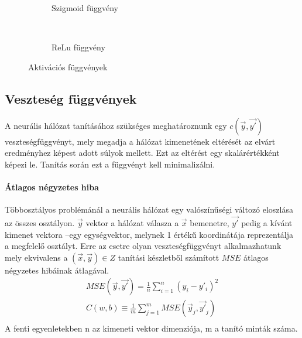 \begin{figure}[h]
	\centering
	\begin{subfigure}[b]{0.3\textwidth}
		\def\svgwidth{0.5\columnwidth}
		
		\caption{Szigmoid függvény}
		\label{fig:sigmoid}
	\end{subfigure}
	~
	\begin{subfigure}[b]{0.3\textwidth}
		\def\svgwidth{0.5\columnwidth}
		
		\caption{ReLu függvény}
	\end{subfigure}
	\caption{Aktivációs függvények }
\end{figure}

\subsection{Veszteség függvények}
A neurális hálózat tanításához szükséges meghatároznunk egy $c(\vec{y},\vec{y'})$ veszteségfüggvényt, mely megadja a hálózat kimenetének eltérését az elvárt eredményhez képest adott súlyok mellett. Ezt az eltérést egy skalárértékként képezi le. Tanítás során ezt a függvényt kell minimalizálni.

\paragraph[MSE]{Átlagos négyzetes hiba}
Többosztályos problémánál a neurális hálózat egy valószínűségi változó eloszlása az összes osztályon. $\vec{y}$ vektor a hálózat válasza a $\vec{x}$ bemenetre, $\vec{y'}$ pedig a kívánt kimenet vektora --egy egységvektor, melynek 1 értékű koordinátája reprezentálja a megfelelő osztályt. Erre az esetre olyan veszteségfüggvényt alkalmazhatunk mely ekvivalens a $(\vec{x},\vec{y})\in Z$ tanítási készletből számított $MSE$ átlagos négyzetes hibáinak átlagával.
\begin{align*}
	MSE(\vec{y},\vec{y'}) = \frac{1}{n}\sum_{i=1}^{n} (y_i - y'_i)^2\\
	C(w,b) \equiv \frac{1}{m}\sum_{j=1}^{m} MSE(\vec{y}_j,\vec{y'}_j)\\
\end{align*}
A fenti egyenletekben n az kimeneti vektor dimenziója, m a tanító minták száma.

